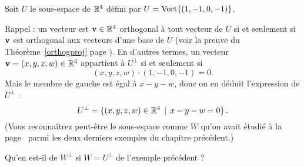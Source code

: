 \begin{myexample}
Soit $U$ le sous-espace de $\R^4$ défini par $U=\sp{(1,-1,0,-1)} $. 

Rappel : un vecteur est $\vv\in\R^4$ orthogonal à tout vecteur de $U$ si et seulement si $\vv$ est orthogonal aux vecteurs d'une base de $U$ (voir la preuve du Théorème~\ref{orthogproj} page \pageref{orthogproj}). En d'autres termes, un vecteur $\vv=(x,y,z,w)\in\R^4$ appartient à $U^\perp$ si et seulement si 
$$(x,y,z,w)\cdot (1,-1,0,-1)=0.$$ Mais le membre de gauche est égal à $ x - y - w$, donc on en déduit l'expression de $U^\perp$ :
$$U^\perp = \set{(x,y,z,w)\in \R^4\st x - y - w=0}\,.
$$
(Vous reconnaîtrez peut-être le sous-espace comme $W$ qu'on avait étudié \`a la page~\pageref{example:GS} parmi les deux derniers exemples du chapitre précédent.)
\end{myexample}

Qu'en est-il de $W^\perp$ si $W=U^\perp$ de l'exemple pr\'ec\'edent ?\medskip

